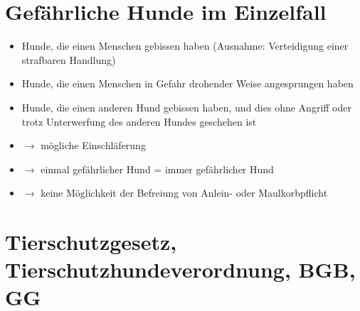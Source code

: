 \section{Gefährliche Hunde im Einzelfall}
    \begin{itemize}
        \item Hunde, die einen Menschen gebissen haben (Ausnahme: Verteidigung einer strafbaren Handlung)
        \item Hunde, die einen Menschen in Gefahr drohender Weise angesprungen haben
        \item Hunde, die einen anderen Hund gebissen haben, und dies ohne Angriff oder trotz Unterwerfung des anderen Hundes geschehen ist
        \item $\rightarrow$ mögliche Einschläferung
        \item $\rightarrow$ einmal gefährlicher Hund = immer gefährlicher Hund
        \item $\rightarrow$ keine Möglichkeit der Befreiung von Anlein- oder Maulkorbpflicht
    \end{itemize}


\section{Tierschutzgesetz, Tierschutzhundeverordnung, BGB, GG}

